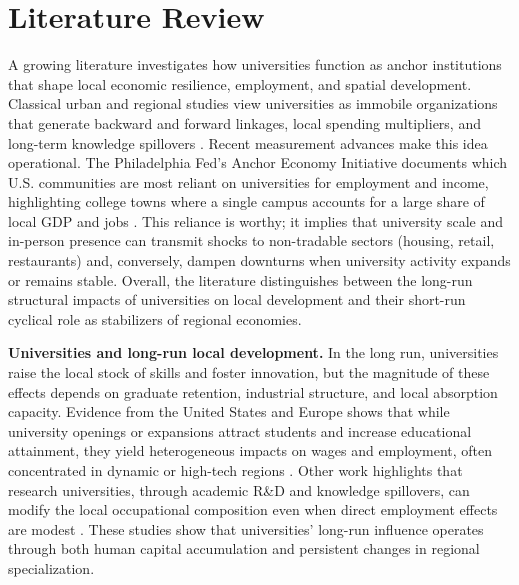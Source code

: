 
\newpage
\section{ Literature Review}

\noindent A growing literature investigates how universities function as anchor institutions that shape local economic resilience, employment, and spatial development. Classical urban and regional studies view universities as immobile organizations that generate backward and forward linkages, local spending multipliers, and long-term knowledge spillovers \citep{Saxenian1996RegionalAdvantage,felsensteinUniversityMetropolitanArena1996}. Recent measurement advances make this idea operational. The Philadelphia Fed's Anchor Economy Initiative documents which U.S. communities are most reliant on universities for employment and income, highlighting college towns where a single campus accounts for a large share of local GDP and jobs \citep{Harker2024AnchorReliance}. This reliance is worthy; it implies that university scale and in-person presence can transmit shocks to non-tradable sectors (housing, retail, restaurants) and, conversely, dampen downturns when university activity expands or remains stable. Overall, the literature distinguishes between the long-run structural impacts of universities on local development and their short-run cyclical role as stabilizers of regional economies.

\noindent \textbf{Universities and long-run local development.} In the long run, universities raise the local stock of skills and foster innovation, but the magnitude of these effects depends on graduate retention, industrial structure, and local absorption capacity. Evidence from the United States and Europe shows that while university openings or expansions attract students and increase educational attainment, they yield heterogeneous impacts on wages and employment, often concentrated in dynamic or high-tech regions \citep{berlingieriCollegeOpeningsLocal2022,ferhatImpactUniversityOpenings,amendolaDoesGraduateHuman2020,abelCollegesUniversitiesIncrease2012}. Other work highlights that research universities, through academic R\&D and knowledge spillovers, can modify the local occupational composition even when direct employment effects are modest \citep{beesonEffectsCollegesUniversities,harrisUniversitiesAnchorInstitutions2016}. These studies show that universities' long-run influence operates through both human capital accumulation and persistent changes in regional specialization.

